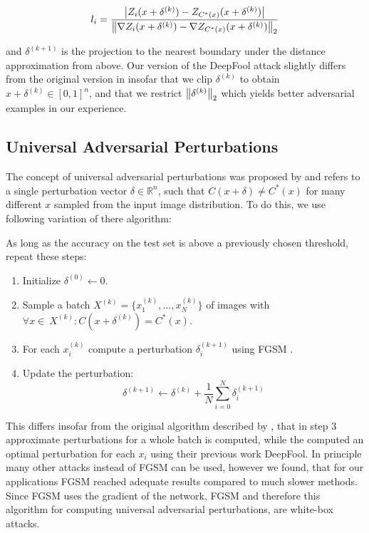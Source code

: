 \begin{equation}
l_i = 
\frac{
	\left \lvert Z_i(x + \delta^{(k)}) - Z_{C^*(x)}(x + \delta^{(k)}) \right \rvert
}
{
	\left \lVert \nabla Z_i(x + \delta^{(k)}) - \nabla Z_{C^*(x)}(x + \delta^{(k)}) \right \rVert _2
}
\end{equation}


and $\delta^{(k+1)}$ is the projection to the nearest boundary under the distance approximation from above. Our version of the DeepFool attack slightly differs from the original version in \cite{deepfool} insofar that we clip $\delta^{(k)}$ to obtain $x + \delta^{(k)} \in [0,1]^n$, and that we restrict $\left \lVert \delta^{(k)} \right \rVert _2$ which yields better adversarial examples in our experience.

\subsection{Universal Adversarial Perturbations}
The concept of universal adversarial perturbations was proposed by \citet{universal} and refers to a single perturbation vector $\delta \in \mathbb{R}^n$, such that $C(x + \delta) \neq C^*(x)$ for many different $x$ sampled from the input image distribution.
To do this, we use following variation of there algorithm:

As long as the accuracy on the test set is above a previously chosen threshold, repeat these steps:
\begin{enumerate}
	\item Initialize $\delta^{(0)} \gets 0$.
	\item Sample a batch $X^{(k)} = \{x_1^{(k)}, ..., x_N^{(k)}\}$ of images with $\forall x \in\ X^{(k)}:  C(x + \delta^{(k)}) = C^*(x)$.
	\item For each $x_i^{(k)}$ compute a perturbation $\delta_i^{(k+1)}$ using FGSM \citep{fgsm}.
	\item Update the perturbation: $$\delta^{(k+1)} \gets \delta^{(k)} + \frac{1}{N} \sum\limits_{i=0}^N \delta_i^{(k+1)}$$
\end{enumerate}

This differs insofar from the original algorithm described by \citet{universal}, that in step 3 approximate perturbations for a whole batch is computed, while the computed an optimal perturbation for each $x_i$ using their previous work DeepFool.  In principle many other attacks instead of FGSM can be used, however we found, that for our applications FGSM reached adequate results compared to much slower methods. Since FGSM uses the gradient of the network, FGSM and therefore this algorithm for computing universal adversarial perturbations, are white-box attacks.
